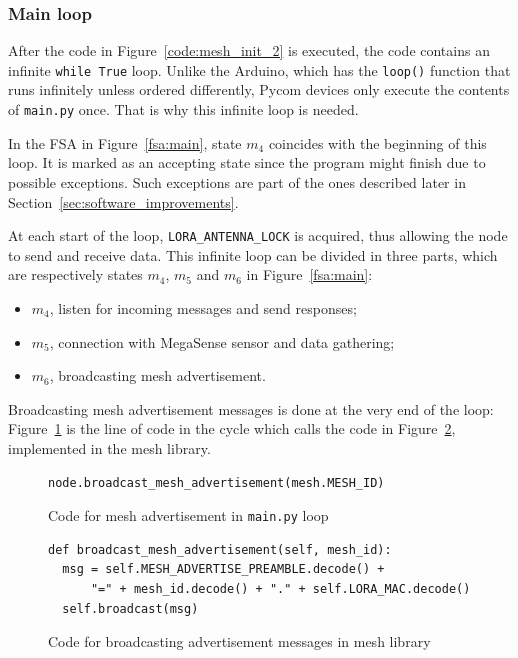 			\subsubsection{Main loop}\label{subsec:loop}
	
				After the code in Figure~\ref{code:mesh_init_2} is executed, the code contains an infinite \texttt{while True} loop.
				Unlike the Arduino, which has the \texttt{loop()} function that runs infinitely unless ordered differently, Pycom devices only execute the contents of \texttt{main.py} once. 
				That is why this infinite loop is needed.
				
				In the FSA in Figure~\ref{fsa:main}, state $ m_{4} $ coincides with the beginning of this loop.
				It is marked as an accepting state since the program might finish due to possible exceptions.
				Such exceptions are part of the ones described later in Section~\ref{sec:software_improvements}.
				
				At each start of the loop, \texttt{LORA\_ANTENNA\_LOCK} is acquired, thus allowing the node to send and receive data.
				This infinite loop can be divided in three parts, which are respectively states $ m_4 $, $ m_5 $ and $ m_6 $ in Figure~\ref{fsa:main}:
				\begin{itemize}
					\item $ m_4 $, listen for incoming messages and send responses;
					\item $ m_5 $, connection with MegaSense sensor and data gathering;
					\item $ m_6 $, broadcasting mesh advertisement.
				\end{itemize}	
			
				Broadcasting mesh advertisement messages is done at the very end of the loop:  Figure~\ref{code:mesh_advertisement_main} is the line of code in the cycle which calls the code in Figure~\ref{code:mesh_advertisement_library}, implemented in the mesh library.
			
				\begin{figure}[h]
					\begin{lstlisting}
node.broadcast_mesh_advertisement(mesh.MESH_ID)
					\end{lstlisting}
					\caption{Code for mesh advertisement in \texttt{main.py} loop}
					\label{code:mesh_advertisement_main}
				\end{figure}
				
				\begin{figure}[h]
					\begin{lstlisting}
def broadcast_mesh_advertisement(self, mesh_id):
  msg = self.MESH_ADVERTISE_PREAMBLE.decode() + 
      "=" + mesh_id.decode() + "." + self.LORA_MAC.decode()
  self.broadcast(msg)
					\end{lstlisting}
					\caption{Code for broadcasting advertisement messages in mesh library}
					\label{code:mesh_advertisement_library}
				\end{figure}
			
